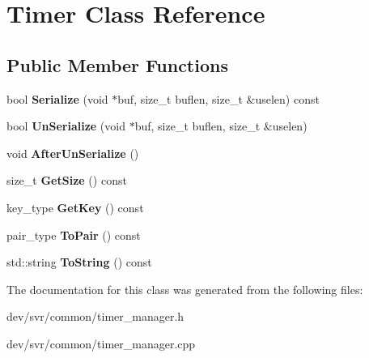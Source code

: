 \hypertarget{classTimer}{
\section{Timer Class Reference}
\label{classTimer}
}
\subsection*{Public Member Functions}
\begin{DoxyCompactItemize}
\item 
\hypertarget{classTimer_afa521b31ad111d0a30e6fd63d5532815}{
bool {\bfseries Serialize} (void $\ast$buf, size\_\-t buflen, size\_\-t \&uselen) const }
\label{classTimer_afa521b31ad111d0a30e6fd63d5532815}

\item 
\hypertarget{classTimer_a9819349424a89392c852a7e792a0d7d2}{
bool {\bfseries UnSerialize} (void $\ast$buf, size\_\-t buflen, size\_\-t \&uselen)}
\label{classTimer_a9819349424a89392c852a7e792a0d7d2}

\item 
\hypertarget{classTimer_aa6f9f43db0feabd621e0a4ba0d005787}{
void {\bfseries AfterUnSerialize} ()}
\label{classTimer_aa6f9f43db0feabd621e0a4ba0d005787}

\item 
\hypertarget{classTimer_a6e69f7386c37c98189763eb1240d1124}{
size\_\-t {\bfseries GetSize} () const }
\label{classTimer_a6e69f7386c37c98189763eb1240d1124}

\item 
\hypertarget{classTimer_a1405682e533dc158007ec8ce12eab490}{
key\_\-type {\bfseries GetKey} () const }
\label{classTimer_a1405682e533dc158007ec8ce12eab490}

\item 
\hypertarget{classTimer_ace2d43cac4789925097be551390268c0}{
pair\_\-type {\bfseries ToPair} () const }
\label{classTimer_ace2d43cac4789925097be551390268c0}

\item 
\hypertarget{classTimer_a4849689a80aff58f35edd5f7a818add2}{
std::string {\bfseries ToString} () const }
\label{classTimer_a4849689a80aff58f35edd5f7a818add2}

\end{DoxyCompactItemize}


The documentation for this class was generated from the following files:\begin{DoxyCompactItemize}
\item 
dev/svr/common/timer\_\-manager.h\item 
dev/svr/common/timer\_\-manager.cpp\end{DoxyCompactItemize}
